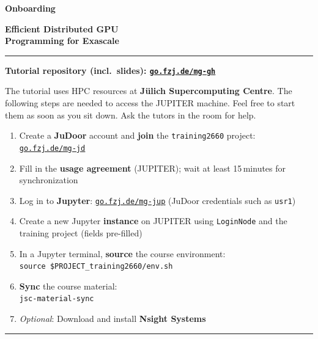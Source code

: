 \documentclass[12pt]{extarticle}
\newcommand{\fBadge}{\ptsansnarrow\bfseries\normalsize}
\newcommand{\fTitle}{\bfseries\huge}
\newcommand{\fBody}{\normalsize}
\newcommand{\kw}[1]{\textcolor{fzjblue}{\bfseries #1}}
\newcommand{\lnk}[2]{\href{#1}{\textcolor{fzjblue}{\uline{\texttt{#2}}}}}
\newcommand{\cmd}[1]{\colorbox{fzjlightblue!40}{\textcolor{fzjdark}{\texttt{#1}}}}
\newcommand{\mono}[1]{\textcolor{fzjdark}{\texttt{#1}}}
\begin{document}
\colorbox{fzjblue}{%
	\parbox[c][7.5mm][c]{34mm}{%
		\color{white}\fBadge\hspace*{2.5mm}Onboarding}}

\vspace{4mm}
{\color{fzjblue}\fTitle Efficient Distributed GPU\\[0.1mm] Programming for Exascale\par}

{\color{fzjblue}\rule{\textwidth}{1pt}}

\vspace{3mm}
\noindent\colorbox{fzjlightblue!45}{%
	\parbox[c][10mm][c]{\dimexpr\textwidth-2\fboxsep\relax}{%
		\centering\color{fzjblue}\bfseries\fBody Tutorial repository (incl.\ slides): \lnk{https://go.fzj.de/mg-gh}{go.fzj.de/mg-gh}%
		}}
\par\nointerlineskip
\vspace{4.5mm}

{\fBody
	The tutorial uses HPC resources at \textcolor{fzjred}{\bfseries Jülich Supercomputing Centre}.
	The following steps are needed to access the JUPITER machine. Feel free to start
	them as soon as you sit down. Ask the tutors in the room for help.\par}
\vfill

\begin{enumerate}[label={\color{fzjblue}\bfseries\arabic*.}, leftmargin=7mm,
	itemsep=3mm, topsep=0pt, parsep=0pt, before={\fBody}]
	\item Create a \kw{JuDoor} account and \kw{join} the \mono{training2660} project:
	      \lnk{https://go.fzj.de/mg-jd}{go.fzj.de/mg-jd}
	\item Fill in the \kw{usage agreement} (JUPITER); wait at least 15\,minutes for
	      synchronization
	\item Log in to \kw{Jupyter}: \lnk{https://go.fzj.de/mg-jup}{go.fzj.de/mg-jup}
	      (JuDoor credentials such as \mono{usr1})
	\item Create a new Jupyter \kw{instance} on JUPITER using \mono{LoginNode}
	      and the training project (fields pre-filled)
	\item In a Jupyter terminal, \kw{source} the course environment:\\
	      \cmd{source \$PROJECT\_training2660/env.sh}
	\item \kw{Sync} the course material:\\
	      \cmd{jsc-material-sync}
	\item \emph{Optional}: Download and install \kw{Nsight Systems}
\end{enumerate}

{\color{fzjblue}\rule{\textwidth}{0.6pt}}\par
\end{document}

